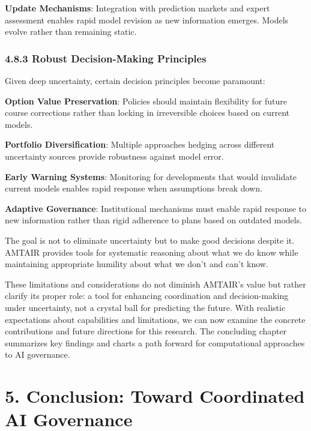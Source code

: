 \documentclass[
  11pt,
  letterpaper,
]{book}
\begin{document}
\textbf{Update Mechanisms}: Integration with prediction markets and
expert assessment enables rapid model revision as new information
emerges. Models evolve rather than remaining static.

\subsection*{4.8.3 Robust Decision-Making
Principles}\label{sec-robust-principles}

Given deep uncertainty, certain decision principles become paramount:

\textbf{Option Value Preservation}: Policies should maintain flexibility
for future course corrections rather than locking in irreversible
choices based on current models.

\textbf{Portfolio Diversification}: Multiple approaches hedging across
different uncertainty sources provide robustness against model error.

\textbf{Early Warning Systems}: Monitoring for developments that would
invalidate current models enables rapid response when assumptions break
down.

\textbf{Adaptive Governance}: Institutional mechanisms must enable rapid
response to new information rather than rigid adherence to plans based
on outdated models.

The goal is not to eliminate uncertainty but to make good decisions
despite it. AMTAIR provides tools for systematic reasoning about what we
do know while maintaining appropriate humility about what we don't and
can't know.

These limitations and considerations do not diminish AMTAIR's value but
rather clarify its proper role: a tool for enhancing coordination and
decision-making under uncertainty, not a crystal ball for predicting the
future. With realistic expectations about capabilities and limitations,
we can now examine the concrete contributions and future directions for
this research. The concluding chapter summarizes key findings and charts
a path forward for computational approaches to AI governance.


\chapter*{5. Conclusion: Toward Coordinated AI
Governance}\label{sec-conclusion}
\end{document}
